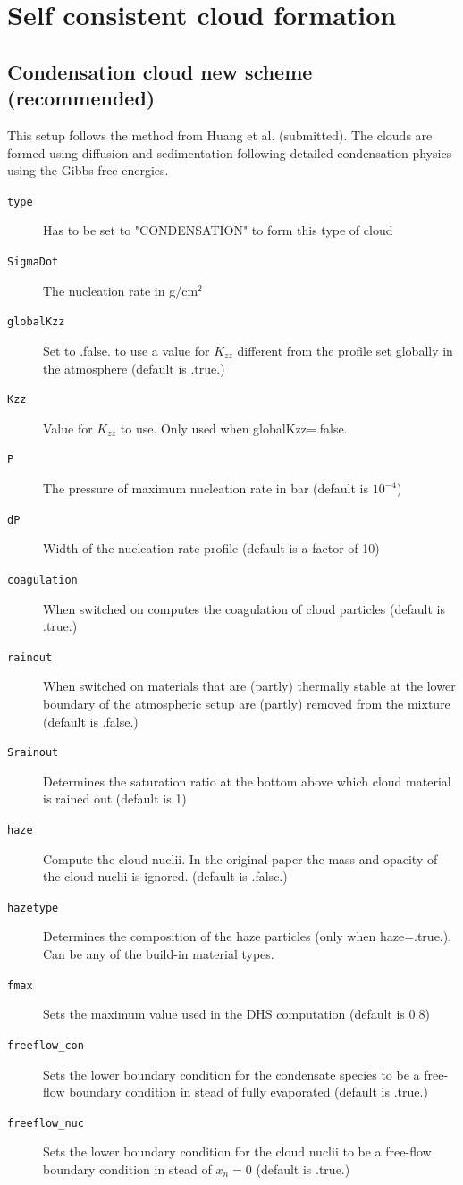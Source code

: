 \documentclass[12pt]{article}
\begin{document}
\section{Self consistent cloud formation}

\subsection{Condensation cloud new scheme (recommended)}

This setup follows the method from Huang et al. (submitted). The clouds are formed using diffusion and sedimentation following detailed condensation physics using the Gibbs free energies.

\begin{description}
\item[\texttt{type}]
Has to be set to "CONDENSATION" to form this type of cloud
\item[\texttt{SigmaDot}]
The nucleation rate in g/cm$^2$
\item[\texttt{globalKzz}]
Set to .false. to use a value for $K_{zz}$ different from the profile set globally in the atmosphere (default is .true.)
\item[\texttt{Kzz}]
Value for $K_{zz}$ to use. Only used when globalKzz=.false.
\item[\texttt{P}]
The pressure of maximum nucleation rate in bar (default is $10^{-4}$)
\item[\texttt{dP}]
Width of the nucleation rate profile (default is a factor of 10)
\item[\texttt{coagulation}] 
When switched on computes the coagulation of cloud particles (default is .true.)
\item[\texttt{rainout}] 
When switched on materials that are (partly) thermally stable at the lower boundary of the atmospheric setup are (partly) removed from the mixture (default is .false.)
\item[\texttt{Srainout}] 
Determines the saturation ratio at the bottom above which cloud material is rained out (default is 1)
\item[\texttt{haze}]
Compute the cloud nuclii. In the original paper the mass and opacity of the cloud nuclii is ignored. (default is .false.)
\item[\texttt{hazetype}]
Determines the composition of the haze particles (only when haze=.true.). Can be any of the build-in material types.
\item[\texttt{fmax}]
Sets the maximum value used in the DHS computation (default is 0.8)
\item[\texttt{freeflow\_con}]
Sets the lower boundary condition for the condensate species to be a free-flow boundary condition in stead of fully evaporated (default is .true.)
\item[\texttt{freeflow\_nuc}]
Sets the lower boundary condition for the cloud nuclii to be a free-flow boundary condition in stead of $x_n=0$ (default is .true.)
\end{description}
\end{document}
